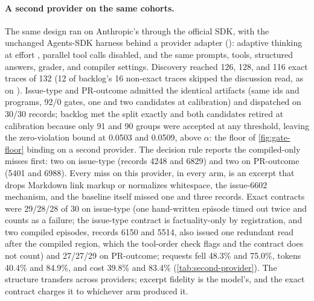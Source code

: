 \paragraph{A second provider on the same cohorts.} The same design ran on
Anthropic's  through the official SDK, with the
unchanged Agents-SDK harness behind a provider adapter
(): adaptive
thinking at effort , parallel tool calls disabled, and the same
prompts, tools, structured answers, grader, and compiler settings. Discovery
reached 126, 128, and 116 exact traces of 132 (12 of backlog's 16 non-exact
traces skipped the discussion read, as on ). Issue-type and PR-outcome
admitted the identical artifacts (same ids and programs, 92/0 gates, one and
two candidates at calibration) and dispatched on 30/30 records; backlog met
the split exactly and both candidates retired at calibration because only 91
and 90 groups were accepted at any threshold, leaving the zero-violation bound
at 0.0503 and 0.0509, above $\alpha$: the floor of \cref{fig:gate-floor} binding
on a second provider. The decision rule reports the compiled-only misses first:
two on issue-type (records 4248 and 6829) and two on PR-outcome (5401 and
6988). Every miss on this provider, in every arm, is an excerpt that drops
Markdown link markup or normalizes whitespace, the issue-6602 mechanism, and
the baseline itself missed one and three records. Exact contracts were
29/28/28 of 30 on issue-type (one hand-written episode timed out twice and
counts as a failure; the issue-type contract is factuality-only by
registration, and two compiled episodes, records 6150 and 5514, also issued
one redundant read after the compiled region, which the tool-order check
flags and the contract does not count) and 27/27/29 on PR-outcome; requests fell 48.3\% and
75.0\%, tokens 40.4\% and 84.9\%, and cost 39.8\% and 83.4\%
(\cref{tab:second-provider}). The structure transfers across providers;
excerpt fidelity is the model's, and the exact contract charges it to
whichever arm produced it.

\begin{table}[t]
  \centering
  \caption{Second provider, design A: Anthropic  on the
  sealed cohorts through the unchanged pipeline. Reductions are against the
  same-provider baseline; the compiled-only misses are the finding the protocol
  reports first, and the backlog refusal is the 92-group floor binding.}
  \label{tab:second-provider}
  \footnotesize
  \setlength{\tabcolsep}{4pt}
  
\end{table}

